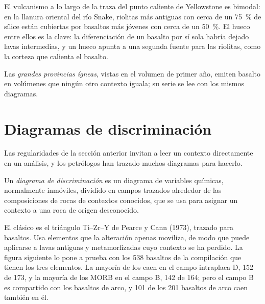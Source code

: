 El vulcanismo a lo largo de la traza del punto caliente de Yellowstone es bimodal: en la llanura oriental
del río Snake, riolitas más antiguas con cerca de un \qty{75}{\percent} de sílice están cubiertas por
basaltos más jóvenes con cerca de un \qty{50}{\percent}. El hueco entre ellos es la clave: la
diferenciación de un basalto por sí sola habría dejado lavas intermedias, y un hueco
apunta a una segunda fuente para las riolitas, como la corteza que calienta el basalto.

Las \emph{grandes provincias ígneas}, vistas en el volumen de primer año, emiten basalto en volúmenes
que ningún otro contexto iguala; su serie se lee con los mismos diagramas.

\section{Diagramas de discriminación}\label{sec:b2:magmatic-series:discrimination}

Las regularidades de la sección anterior invitan a leer un contexto directamente en un
análisis, y los petrólogos han trazado muchos diagramas para hacerlo.

\begin{definition}\label{def:b2:magmatic-series:discrimination}
Un \emph{diagrama de discriminación} es un diagrama de
variables químicas, normalmente  inmóviles, dividido en campos trazados
alrededor de las composiciones de rocas de contextos conocidos, que se usa para asignar un contexto a una
roca de origen desconocido.
\end{definition}

El clásico es el triángulo Ti--Zr--Y de Pearce y Cann (1973), trazado para basaltos.
Usa elementos que la alteración apenas moviliza, de modo que puede aplicarse a lavas antiguas
y metamorfizadas cuyo contexto se ha perdido. La figura siguiente lo pone a prueba con los 538 basaltos de la
compilación que tienen los tres elementos. La mayoría de los  caen en el
campo intraplaca D, 152 de 173, y la mayoría de los MORB en el campo B, 142 de 164; pero el campo B
es compartido con los basaltos de arco, y 101 de los 201 basaltos de arco caen también en él.

